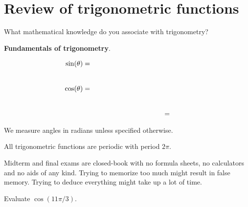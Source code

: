 \documentclass[../main.tex]{subfiles}
\begin{document}
 \section{Review of trigonometric functions}
\faComments{} What mathematical knowledge do you associate with trigonometry?


\begin{mdframed}[style=simple-compact]
  \textbf{Fundamentals of trigonometry}.

  \begin{minipage}{0.45\textwidth}
    
  \end{minipage}
  \begin{minipage}{0.55\textwidth}
    \begin{align} 
      \label{eq:sin}
      \sin(\theta) = \hspace{2in} \\[5ex]
      \label{eq:cos}
      \cos(\theta) = \hspace{2in} \\[5ex]
      \label{eq:trig-pythegorean}
      \hspace{1.5in} = \hspace{1cm}
    \end{align}
  \end{minipage}

  \bigskip
  We measure angles in radians unless specified otherwise.
  \begin{center}
    
    
  \end{center}

  \bigskip
  All trigonometric functions are periodic with period \(2\pi\).
  \begin{center}
    

    
  \end{center}
\end{mdframed}
\clearpage

\faExclamationTriangle{}
Midterm and final exams are closed-book with no formula sheets, no calculators and no aids of any kind.  Trying to memorize too much might result in false memory.  Trying to deduce everything might take up a lot of time.  

\begin{example}
  Evaluate \(\cos(11\pi/3)\).

\end{example}
\end{document}
